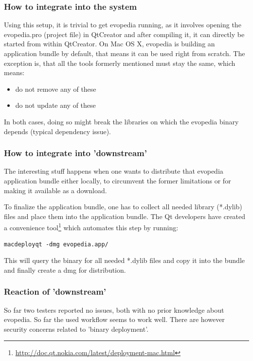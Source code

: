 \documentclass[a4paper,10pt]{article}
\begin{document}
\subsubsection*{How to integrate into the system}
Using this setup, it is trivial to get evopedia running, as it involves opening the evopedia.pro (project file) in QtCreator and after compiling it, it can directly be started from within QtCreator. On Mac OS X, evopedia is building an application bundle by default, that means it can be used right from scratch. The exception is, that all the tools formerly mentioned must stay the same, which means:
\begin{itemize}
 \item do not remove any of these
 \item do not update any of these
\end{itemize}
In both cases, doing so might break the libraries on which the evopedia binary depends (typical dependency issue).

\subsubsection*{How to integrate into 'downstream'}
The interesting stuff happens when one wants to distribute that evopedia application bundle either locally, to circumvent the former limitations or for making it available as a download. 

To finalize the application bundle, one has to collect all needed library (*.dylib) files and place them into the application bundle. The Qt developers have created a convenience tool\footnote{\url{http://doc.qt.nokia.com/latest/deployment-mac.html}} which automates this step by running:

\begin{verbatim}
macdeployqt -dmg evopedia.app/ 
\end{verbatim}

This will query the binary for all needed *.dylib files and copy it into the bundle and finally create a dmg for distribution.

\subsubsection*{Reaction of 'downstream'}
So far two testers reported no issues, both with no prior knowledge about evopedia. So far the used workflow seems to work well. There are however security concerns related to 'binary deployment'.
\end{document}
